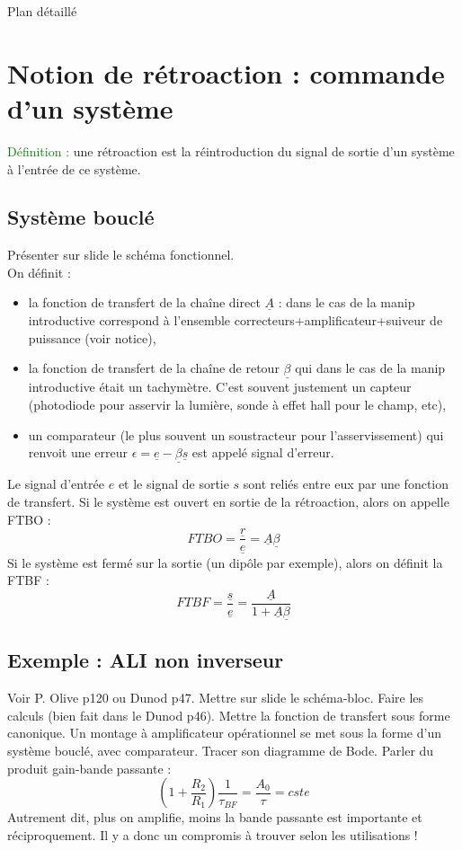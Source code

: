 \begin{reportBlock}{Plan détaillé}
  \section{Notion de rétroaction : commande d'un système}
   \textcolor{green}{Définition :} une rétroaction est la réintroduction du signal de sortie d'un système à l'entrée de ce système.
  \subsection{Système bouclé}
  Présenter sur slide le schéma fonctionnel.\\
  On définit :
  \begin{itemize}
      \item la fonction de transfert de la chaîne direct $\underline{A}$ : dans le cas de la manip introductive correspond à l'ensemble correcteurs+amplificateur+suiveur de puissance (voir notice),
      \item la fonction de transfert de la chaîne de retour $\underline{\beta}$ qui dans le cas de la manip introductive était un tachymètre. C'est souvent justement un capteur (photodiode pour asservir la lumière, sonde à effet hall pour le champ, etc),
      \item un comparateur (le plus souvent un soustracteur pour l'asservissement) qui renvoit une erreur $\epsilon = \underline{e}-\underline{\beta}\underline{s}$ est appelé signal d'erreur.
  \end{itemize}
  Le signal d'entrée $e$ et le signal de sortie $s$ sont reliés entre eux par une fonction de transfert. Si le système est ouvert en sortie de la rétroaction, alors on appelle FTBO :
  \begin{equation}
      FTBO = \frac{\underline{r}}{\underline{e}} = \underline{A}\underline{\beta}
  \end{equation}
  Si le système est fermé sur la sortie (un dipôle par exemple), alors on définit la FTBF :
  \begin{equation}
      FTBF = \frac{\underline{s}}{\underline{e}} = \frac{\underline{A}}{1+\underline{A}\underline{\beta}}
  \end{equation}

  \subsection{Exemple : ALI non inverseur}
  Voir P. Olive p120 ou Dunod p47. Mettre sur slide le schéma-bloc. Faire les calculs (bien fait dans le Dunod p46). Mettre la fonction de transfert sous forme canonique. Un montage à amplificateur opérationnel se met sous la forme d'un système bouclé, avec comparateur. Tracer son diagramme de Bode. Parler du produit gain-bande passante :
  \begin{equation}
      (1+\frac{R_2}{R_1})\frac{1}{\tau_{BF}}=\frac{A_0}{\tau}=cste
  \end{equation}
  Autrement dit, plus on amplifie, moins la bande passante est importante et réciproquement. Il y a donc un compromis à trouver selon les utilisations !

\end{reportBlock}
